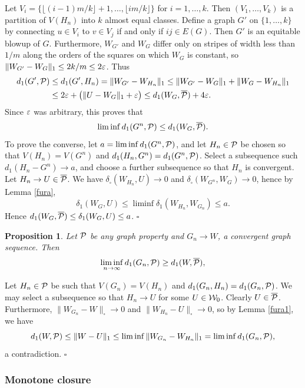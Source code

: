 \documentclass{article}
\newtheorem{prop}[theorem]{Proposition}
\newenvironment{proof}{\medskip\noindent{\bf Proof. }}{\hfill$\square$\medskip}
\begin{document}
\begin{proof}
Let $V_i=\bigl\{\lfloor (i-1)m/k\rfloor +1,\dots, \lfloor
im/k\rfloor\bigr\}$ for $i=1,\dots,k$. Then $(V_1,\dots,V_k)$ is a
partition of $V(H_n)$ into $k$ almost equal classes. Define a graph
$G'$ on $\{1,\dots,k\}$ by connecting $u\in V_i$ to $v\in V_j$ if and
only if $ij\in E(G)$. Then $G'$ is an equitable blowup of $G$.
Furthermore, $W_{G'}$ and $W_G$ differ only on stripes of width less
than $1/m$ along the orders of the squares on which $W_G$ is
constant, so $\|W_{G'}-W_G\|_1 \le 2k/m\le 2\varepsilon$. Thus
\begin{align*}
 d_1(G',\mathcal{P})&\le d_1(G',H_n) = \|W_{G'}-W_{H_n}\|_1 \le
\|W_{G'}-W_G\|_1+\|W_G-W_{H_n}\|_1\\
&\le 2\varepsilon + \bigl(\|U-W_G\|_1+\varepsilon\bigr) \le
d_1(W_G,\overline{\mathcal{P}})+4\varepsilon.
\end{align*}
Since $\varepsilon$ was arbitrary, this proves that
\[
\liminf d_1(G^n,\mathcal{P}) \le d_1(W_G,\overline{\mathcal{P}}).
\]
To prove the converse, let $a=\liminf d_1(G^n,\mathcal{P})$, and let
$H_n\in\mathcal{P}$ be chosen so that $V(H_n)=V(G^n)$ and $d_1(H_n, G^n) =
d_1(G^n,\mathcal{P})$. Select a subsequence such $d_1(H_n-G^n)\to a$, and
choose a further subsequence so that $H_n$ is convergent. Let $H_n\to
U\in\overline{\mathcal{P}}$. We have $\delta_\square(W_{H_n},U)\to 0$ and
$\delta_\square(W_{G^n},W_G)\to 0$, hence by Lemma \ref{fura},
\[
\delta_1(W_G,U) \le \liminf\delta_1(W_{H_n},W_{G_n}) \le a.
\]
Hence $d_1(W_G,\overline{\mathcal{P}})\le \delta_1(W_G,U)\le a$.
\end{proof}

\begin{prop}\label{prop:fura1}
Let $\mathcal{P}$ be any graph property and $G_n\to W$, a convergent graph
sequence. Then
\[
\liminf_{n\to\infty} d_1(G_n,\mathcal{P}) \ge d_1(W,\overline{\mathcal{P}}),
\]
\end{prop}

\begin{proof}
Let $H_n\in\mathcal{P}$ be such that $V(G_n)=V(H_n)$ and
$d_1(G_n,H_n)=d_1(G_n,\mathcal{P})$. We may select a subsequence so that
$H_n\to U$ for some $U\in\mathcal{W}_0$. Clearly $U\in\overline{\mathcal{P}}$.
Furthermore, $\|W_{G_n}-W\|_\square\to 0$ and
$\|W_{H_n}-U\|_\square\to 0$, so by Lemma \ref{fura1}, we have
\[
d_1(W,\mathcal{P}) \le \|W-U\|_1 \le \liminf \|W_{G_n}-W_{H_n}\|_1= \liminf
d_1(G_n,\mathcal{P}),
\]
a contradiction.
\end{proof}

\subsubsection{Monotone closure}
\end{document}
